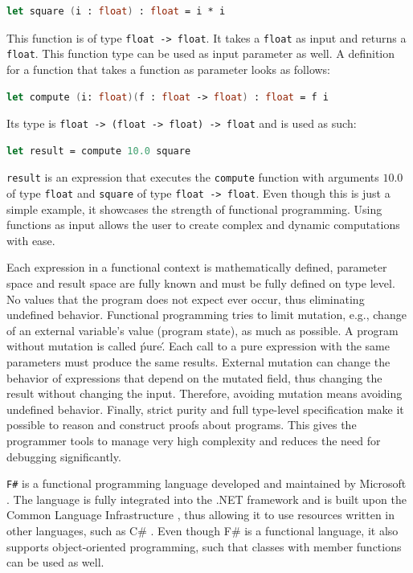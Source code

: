 \begin{lstlisting}[language=FSharp]
let square (i : float) : float = i * i 
\end{lstlisting}

This function is of type \verb|float -> float|. It takes a \verb|float| as input and returns a \verb|float|. This function type can be used as input parameter as well. A definition for a function that takes a function as parameter looks as follows: 

\begin{lstlisting}[language=FSharp]
let compute (i: float)(f : float -> float) : float = f i
\end{lstlisting}
Its type is \verb|float -> (float -> float) -> float| and is used as such: 
\begin{lstlisting}[language=FSharp]
let result = compute 10.0 square
\end{lstlisting}

\verb|result| is an expression that executes the \verb|compute| function with arguments $10.0$ of type \verb|float| and \verb|square| of type \verb|float -> float|. Even though this is just a simple example, it showcases the strength of functional programming.  Using functions as input allows the user to create complex and dynamic computations with ease. 

\par

Each expression in a functional context is mathematically defined, parameter space and result space are fully known and must be fully defined on type level. No values that the program does not expect ever occur, thus eliminating undefined behavior. 
Functional programming tries to limit mutation, e.g., change of an external variable's value (program state), as much as possible. A program without mutation is called \'pure\'. Each call to a pure expression with the same parameters must produce the same results. External mutation can change the behavior of expressions that depend on the mutated field, thus changing the result without changing the input. Therefore, avoiding mutation means avoiding undefined behavior.
Finally, strict purity and full type-level specification make it possible to reason and construct proofs about programs. This gives the programmer tools to manage very high complexity and reduces the need for debugging significantly.

\par

\verb|F#| is a functional programming language developed and maintained by Microsoft \cite{Microsoft}. The language is fully integrated into the .NET framework \cite{DotNet} and is built upon the Common Language Infrastructure \cite{CLI}, thus allowing it to use resources written in other languages, such as C\# \cite{CSharp}. Even though F\# is a functional language, it also supports object-oriented programming, such that classes with member functions can be used as well. 


